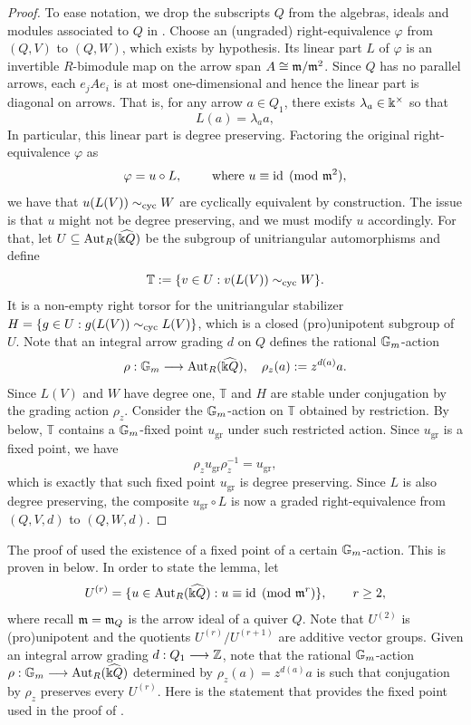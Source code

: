 \begin{proof}
To ease notation, we drop the subscripts $Q$ from the algebras, ideals and modules associated to $Q$ in . Choose an (ungraded) right-equivalence $\varphi$ from $(Q,V)$ to $(Q,W)$, which exists by hypothesis. Its linear part $L$ of $\varphi$ is an invertible $R$-bimodule map on the arrow span $A\cong \mathfrak m/\mathfrak m^2$.  Since $Q$ has no parallel arrows, each $e_jAe_i$ is at most one-dimensional and hence the linear part is diagonal on arrows. That is, for any arrow $a\in Q_1$, there exists $\lambda_a\in\Bbbk^\times$ so that
\[
L(a)=\lambda_a a,
\]
In particular, this linear part is degree preserving. Factoring the original right-equivalence $\varphi$ as
\[
\varphi=u\circ L,
\qquad\mbox{ where } u\equiv\operatorname{id}\pmod{\mathfrak m^2},
\]
we have that $u(L(V))\sim_{\mathrm{cyc}}W$ are cyclically equivalent by construction. The issue is that $u$ might not be degree preserving, and we must modify $u$ accordingly. For that, let $U\subseteq \operatorname{Aut}_{R}(\widehat{\Bbbk Q})$ be the subgroup of unitriangular automorphisms and define
\[
\mathbb T
:=
\{v\in U:v(L(V))\sim_{\mathrm{cyc}}W\}.
\]
It is a non-empty right torsor for the unitriangular stabilizer $H=\{g\in U:g(L(V))\sim_{\mathrm{cyc}}L(V)\}$, which is a closed (pro)unipotent subgroup of $U$. Note that an integral arrow grading $d$ on $Q$ defines the rational $\mathbb{G}_{m}$-action
\[
\rho:\mathbb{G}_{m}\longrightarrow\operatorname{Aut}_R(\widehat{\Bbbk Q}),\quad \rho_z(a):=z^{d(a)}a.
\]
Since $L(V)$ and $W$ have degree one, $\mathbb T$ and $H$ are stable under conjugation by the grading action $\rho_z$. Consider the $\mathbb{G}_{m}$-action on $\mathbb T$ obtained by restriction. By  below, $\mathbb T$ contains a $\mathbb{G}_{m}$-fixed point $u_{\mathrm{gr}}$ under such restricted action. Since $u_{\mathrm{gr}}$ is a fixed point, we have
\[
\rho_z u_{\mathrm{gr}}\rho_z^{-1}=u_{\mathrm{gr}},
\]
which is exactly that such fixed point $u_{\mathrm{gr}}$ is degree preserving.  Since $L$ is also degree preserving, the composite $u_{\mathrm{gr}}\circ L$ is now a graded right-equivalence from $(Q,V,d)$ to $(Q,W,d)$.
\end{proof}

The proof of  used the existence of a fixed point of a certain $\mathbb{G}_{m}$-action. This is proven in  below. In order to state the lemma, let
\[
U^{(r)}=\{u\in\operatorname{Aut}_R(\widehat{\Bbbk Q}):u\equiv\operatorname{id}\pmod{\mathfrak m^r}\},
\qquad r\ge2,
\]
where recall $\mathfrak m=\mathfrak m_Q$ is the arrow ideal of a quiver $Q$. Note that $U^{(2)}$ is (pro)unipotent and the quotients $U^{(r)}/U^{(r+1)}$ are additive vector groups. Given an integral arrow grading $d:Q_1\longrightarrow\mathbb Z$, note that the rational $\mathbb{G}_{m}$-action $\rho:\mathbb{G}_{m}\longrightarrow\operatorname{Aut}_R(\widehat{\Bbbk Q})$ determined by $\rho_z(a)=z^{d(a)}a$ is such that conjugation by $\rho_z$ preserves every $U^{(r)}$. Here is the statement that provides the fixed point used in the proof of .

